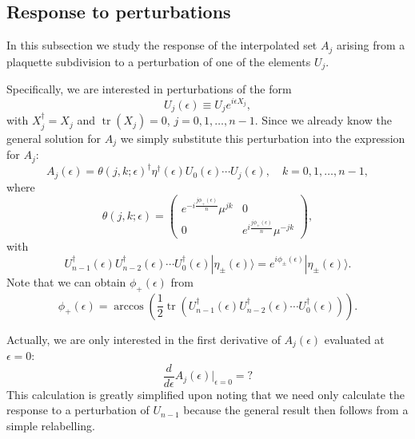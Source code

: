 \documentclass[12pt]{amsart}
\newcommand{\tr}{\operatorname{tr}}
\theoremstyle{definition}
\theoremstyle{remark}
\numberwithin{equation}{section}
\begin{document}
\subsection{Response to perturbations}
In this subsection we study the response of the interpolated set $A_j$ arising from a plaquette subdivision to a perturbation of one of the elements $U_j$.

Specifically, we are interested in perturbations of the form
\begin{equation}
	U_j(\epsilon) \equiv U_j e^{i\epsilon X_j},
\end{equation}
with $X^\dag_j = X_j$ and $\tr(X_j) = 0$, $j = 0, 1, \ldots, n-1$. Since we already know the general solution for $A_j$ we simply substitute this perturbation into the expression for $A_j$:
\begin{equation}
	A_j(\epsilon) = \theta(j,k; \epsilon)^\dag \eta^\dag(\epsilon) U_0(\epsilon) \cdots U_{j}(\epsilon), \quad k = 0, 1, \ldots, n-1,
\end{equation}
where 
\begin{equation}	
	\theta(j,k; \epsilon) = \begin{pmatrix} e^{-i\frac{j\phi_{+}(\epsilon)}{n}}\mu^{jk} & 0 \\ 0 &  e^{i\frac{j\phi_{+}(\epsilon)}{n}}\mu^{-jk}\end{pmatrix},
\end{equation}
with 
\begin{equation}
	U_{n-1}^\dag(\epsilon) U_{n-2}^\dag(\epsilon) \cdots U_0^\dag(\epsilon) |\eta_{\pm}(\epsilon)\rangle = e^{i\phi_{\pm}(\epsilon)}|\eta_{\pm}(\epsilon)\rangle.
\end{equation}
Note that we can obtain $\phi_+(\epsilon)$ from
\begin{equation}
	\phi_+(\epsilon) = \arccos\left(\frac12 \tr(U_{n-1}^\dag(\epsilon) U_{n-2}^\dag(\epsilon) \cdots U_0^\dag(\epsilon))\right).
\end{equation}

Actually, we are only interested in the first derivative of $A_j(\epsilon)$ evaluated at $\epsilon = 0$:
\begin{equation}
	\frac{d}{d\epsilon} A_j(\epsilon) \bigg|_{\epsilon = 0} = ?
\end{equation}
This calculation is greatly simplified upon noting that we need only calculate the response to a perturbation of $U_{n-1}$ because the general result then follows from a simple relabelling.
\end{document}
